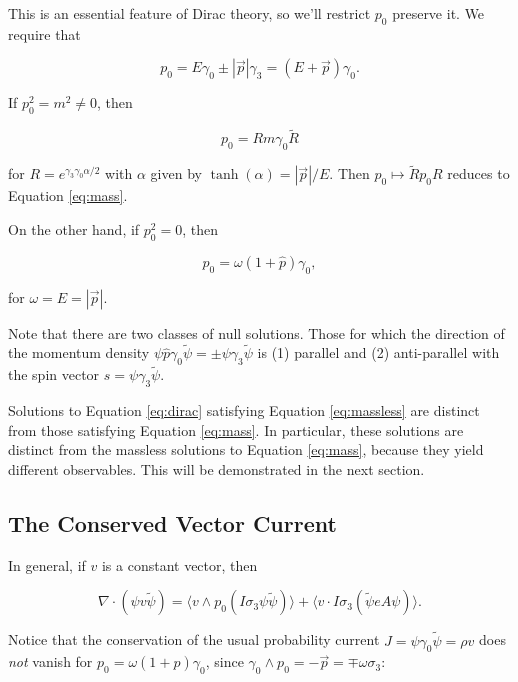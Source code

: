 \documentclass{article}
\begin{document}
  This is an essential feature of Dirac theory, so we'll restrict $p_0$ preserve it. We require that

  \begin{equation}
    p_0 = E \gamma_0 \pm |\vec p| \gamma_3 = (E + \vec p) \gamma_0.
  \end{equation} 

  If $p_0^2 = m^2 \not= 0$, then 

  \begin{equation}
    p_0 = R m \gamma_0 \widetilde R
  \end{equation} 

   for $R = e^{\gamma_3 \gamma_0 \alpha/2}$ with $\alpha$ given by $\tanh(\alpha) = |\vec p|/E$. Then $p_0 \mapsto \widetilde R p_0 R$ reduces to Equation \ref{eq:mass}.

  On the other hand, if $p_0^2 = 0$, then

  \begin{equation}
    p_0 = \omega (1 + \hat p) \gamma_0, \label{eq:massless}
  \end{equation}

  for $\omega = E = |\vec p|$. 

  Note that there are two classes of null solutions. Those for which the direction of the momentum density $\psi \hat p \gamma_0 \widetilde \psi = \pm \psi \gamma_3 \widetilde \psi$ is (1) parallel and (2) anti-parallel with the spin vector $s = \psi \gamma_3 \widetilde \psi$.

  Solutions to Equation \ref{eq:dirac} satisfying Equation \ref{eq:massless} are distinct from those satisfying Equation \ref{eq:mass}. In particular, these solutions are distinct from the massless solutions to Equation \ref{eq:mass}, because they yield different observables. This will be demonstrated in the next section.

  \subsection{The Conserved Vector Current}

  In general, if $v$ is a constant vector, then

  \begin{equation}
    \nabla \cdot (\psi v \widetilde \psi) = \langle v \wedge p_0 (I \sigma_3 \psi \widetilde \psi) \rangle + \langle v \cdot I \sigma_3 (\widetilde \psi e A \psi) \rangle.
  \end{equation}

  Notice that the conservation of the usual probability current $J = \psi \gamma_0 \widetilde \psi = \rho v$ does \emph{not} vanish for $p_0 = \omega (1 + \hat p) \gamma_0$, since $\gamma_0 \wedge p_0 = - \vec p = \mp \omega \sigma_3$:
\end{document}
